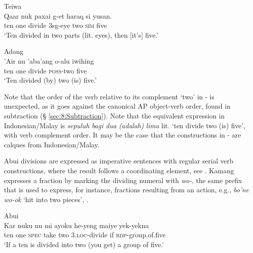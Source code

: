  

 


\ea
\label{ex:8:1246}
{\upshape Teiwa}\\  
 \gll Qaar  nuk  paxai  g-et  haraq  si  yusan.   \\
  ten  one  divide  3sg-eye  two  \textsc{sim}  five   \\
 \glt `Ten divided in two parts (lit. eyes), then [it's] five.'
\z
 

\ea%
\label{bkm:Ref342664505}
{\upshape Adang}\\
\gll  'Air nu  'aba'ang  o-alu  iwihing\\  
    ten one  divide  \textsc{poss-}two  five \\
\glt `Ten divided (by) two (is) five.'  
\z

 

 

  

Note that the order of the verb relative to its complement `two' in - is unexpected, as it goes against the canonical AP object-verb order, found in subtraction ({\S} \ref{sec:8:Subtraction}). Note that the equivalent expression in Indonesian/Malay is \textit{sepuluh bagi dua (adalah)} \textit{lima} lit. `ten divide two (is) five', with verb complement order. It may be the case that the constructions in - are calques from Indonesian/Malay. 

Abui divisions are expressed as imperative sentences with regular serial verb constructions, where the result follows a coordinating element, see . Kamang expresses a fraction by marking the dividing numeral with \textit{wo-}, the same prefix that is used to express, for instance, fractions resulting from an action, e.g., \textit{bo'ne wo-ok} `hit into two pieces', . 


\ea%
\label{bkm:Ref358116296}
{\upshape Abui}\\
\gll  Kar  nuku  nu  mi  ayoku  he-yeng  maiye  yek-yekna \\  
    ten  one  \textsc{spec}  take  two  3.\textsc{loc-}divide  if  \textsc{rdp-}group.of.five \\
\glt  `If a ten is divided into two (you get) a group of five.'
\z



 




